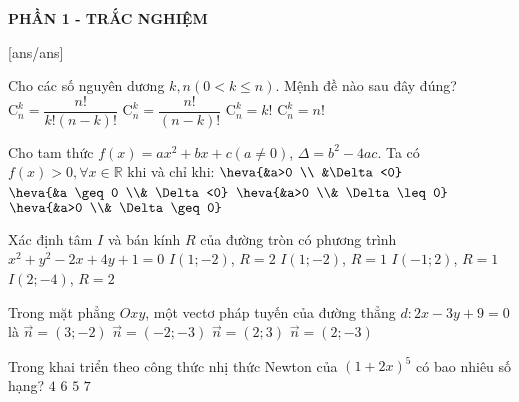 
\begin{center}
	\textbf{PHẦN 1 - TRẮC NGHIỆM}
\end{center}
[ans/ans]
\begin{ex}%
Cho các số nguyên dương $k, n(0<k \leq n)$. Mệnh đề nào sau đây đúng?
\choice
{\True $\mathrm{C}_n^k=\dfrac{n !}{k !(n-k) !}$}
{$\mathrm{C}_n^k=\dfrac{n !}{(n-k) !}$}
{$\mathrm{C}_n^k=k!$}
{$\mathrm{C}_n^k=n!$}
\end{ex}
\begin{ex}%
Cho tam thức $f(x)=a x^2+b x+c(a \neq 0)$, $\Delta=b^2-4 a c$. Ta có $f(x)>0, \forall x \in \mathbb{R}$ khi và chỉ khi:
\choice
{\True $\heva{&a>0 \\ &\Delta<0}$}
{$\heva{&a \geq 0 \\& \Delta<0}$}
{$\heva{&a>0 \\& \Delta \leq 0}$}
{$\heva{&a>0 \\& \Delta \geq 0}$}
\end{ex}
\begin{ex}%
Xác định tâm $I$ và bán kính $R$ của đường tròn có phương trình $x^2+y^2-2 x+4 y+1=0$
\choice
{\True $I(1 ;-2)$, $R =2$}
{$I(1 ;-2)$, $R =1$}
{$I(-1 ; 2)$, $R=1$}
{$I(2 ;-4)$, $R =2$}
\end{ex}
\begin{ex}%
Trong mặt phẳng $O x y$, một vectơ pháp tuyến của đường thẳng $d\colon2 x-3 y+9=0$ là
\choice
{$\vec{n}=(3 ;-2)$}
{$\vec{n}=(-2 ;-3)$}
{$\vec{n}=(2 ; 3)$}
{\True $\vec{n}=(2 ;-3)$}
\end{ex}
\begin{ex}%
Trong khai triển theo công thức nhị thức Newton của $(1+2 x)^5$ có bao nhiêu số hạng?
\choice
{$4$}
{\True $6$}
{$5$}
{$7$}
\end{ex}
